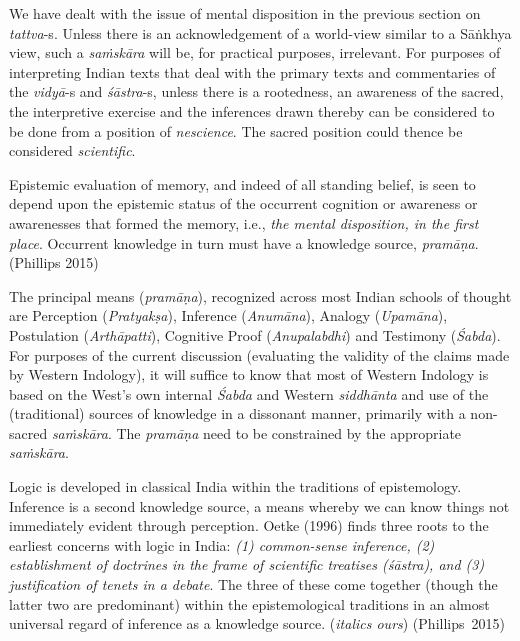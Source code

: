 We have dealt with the issue of mental disposition in the previous section on {\sl tattva}-s. Unless there is an acknowledgement of a world-view similar to a Sāṅkhya view, such a {\sl saṁskāra} will be, for practical purposes, irrelevant. For purposes of interpreting Indian texts that deal with the primary texts and commentaries of the {\sl vidyā}-s and {\sl śāstra}-s, unless there is a rootedness, an awareness of the sacred, the interpretive exercise and the inferences drawn thereby can be considered to be done from a position of {\sl nescience}. The sacred position could thence be considered {\sl scientific}.
\begin{myquote}
Epistemic evaluation of memory, and indeed of all standing belief, is seen to depend upon the epistemic status of the occurrent cognition or awareness or awarenesses that formed the memory, i.e., {\sl the mental disposition, in the first place}. Occurrent knowledge in turn must have a knowledge source, {\sl pramāṇa}.\hfill (Phillips 2015)
\end{myquote}

The principal means ({\sl pramāṇa}), recognized across most Indian schools of thought are Perception ({\sl Pratyakṣa}), Inference ({\sl Anumāna}), Analogy ({\sl Upamāna}), Postulation ({\sl Arthāpatti}), Cognitive Proof ({\sl Anupalabdhi}) and Testimony ({\sl Śabda}). For purposes of the current discussion (evaluating the validity of the claims made by Western Indology), it will suffice to know that most of Western Indology is based on the West's own internal {\sl Śabda} and Western {\sl siddhānta} and use of the (traditional) sources of knowledge in a dissonant manner,  primarily with a non-sacred {\sl saṁ\-skāra}. The {\sl pramāṇa} need to be constrained by the appropriate {\sl saṁskāra}.
\begin{myquote}
Logic is developed in classical India within the traditions of epistemology. Inference is a second knowledge source, a means whereby we can know things not immediately evident through perception. Oetke (1996) finds three roots to the earliest concerns with logic in India: {\sl (1) common-sense inference, (2) establishment of doctrines in the frame of scientific treatises (\sl śāstra\relax), and (3) justification of tenets in a debate}. The three of these come together (though the latter two are predominant) within the epistemological traditions in an almost universal regard of inference as a knowledge source. ({\sl italics ours})
\hfill \hbox{(Phillips 2015)}
\end{myquote}

